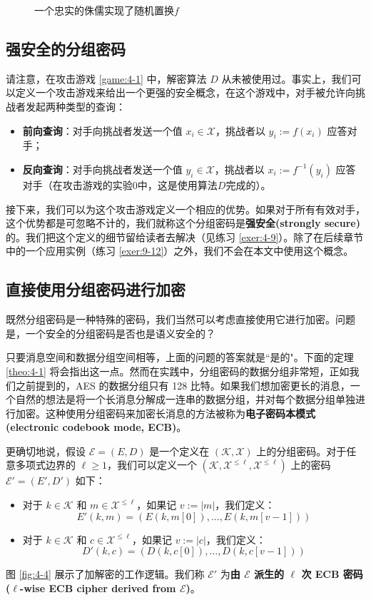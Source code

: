 \begin{figure}
  \centering
  
  \caption{一个忠实的侏儒实现了随机置换$f$}
  \label{fig:4-3}
\end{figure}

\subsection{强安全的分组密码}\label{subsec:4-1-3}

请注意，在攻击游戏 \ref{game:4-1} 中，解密算法 $D$ 从未被使用过。事实上，我们可以定义一个攻击游戏来给出一个更强的安全概念，在这个游戏中，对手被允许向挑战者发起两种类型的查询：
\begin{itemize}
	\item \textbf{前向查询}：对手向挑战者发送一个值 $x_i\in\mathcal{X}$，挑战者以 $y_i:=f(x_i)$ 应答对手；
	\item \textbf{反向查询}：对手向挑战者发送一个值 $y_i\in\mathcal{X}$，挑战者以 $x_i:=f^{-1}(y_i)$ 应答对手（在攻击游戏的实验$0$中，这是使用算法$D$完成的）。
\end{itemize}
接下来，我们可以为这个攻击游戏定义一个相应的优势。如果对于所有有效对手，这个优势都是可忽略不计的，我们就称这个分组密码是\textbf{强安全(strongly secure)}的。我们把这个定义的细节留给读者去解决（见练习 \ref{exer:4-9}）。除了在后续章节中的一个应用实例（练习 \ref{exer:9-12}）之外，我们不会在本文中使用这个概念。

\subsection{直接使用分组密码进行加密}\label{subsec:4-1-4}

既然分组密码是一种特殊的密码，我们当然可以考虑直接使用它进行加密。问题是，一个安全的分组密码是否也是语义安全的？

只要消息空间和数据分组空间相等，上面的问题的答案就是``是的"。下面的定理 \ref{theo:4-1} 将会指出这一点。然而在实践中，分组密码的数据分组非常短，正如我们之前提到的，AES 的数据分组只有 128 比特。如果我们想加密更长的消息，一个自然的想法是将一个长消息分解成一连串的数据分组，并对每个数据分组单独进行加密。这种使用分组密码来加密长消息的方法被称为\textbf{电子密码本模式 (electronic codebook mode, ECB)}。

更确切地说，假设 $\mathcal{E}=(E,D)$ 是一个定义在 $(\mathcal{K},\mathcal{X})$ 上的分组密码。对于任意多项式边界的 $\ell\geq1$，我们可以定义一个 $(\mathcal{K},\mathcal{X}^{\leq\ell},\mathcal{X}^{\leq\ell})$ 上的密码 $\mathcal{E}'=(E',D')$ 如下：
\begin{itemize}
	\item 对于 $k\in\mathcal{K}$ 和 $m\in\mathcal{X}^{\leq\ell}$，如果记 $v:=|m|$，我们定义：
	\[
    E'(k,m)=(E(k,m[0]),\dots,E(k,m[v-1]))
    \]
	\item 对于 $k\in\mathcal{K}$ 和 $c\in\mathcal{X}^{\leq\ell}$，如果记 $v:=|c|$，我们定义：
	\[
	D'(k,c)=(D(k,c[0]),\dots,D(k,c[v-1]))
	\]
\end{itemize}
图 \ref{fig:4-4} 展示了加解密的工作逻辑。我们称 $\mathcal{E}'$ 为\textbf{由 $\mathcal{E}$ 派生的 $\ell$ 次 ECB 密码 ($\ell$-wise ECB cipher derived from $\mathcal{E}$)}。

